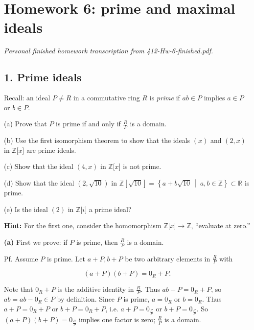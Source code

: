 \chapter{Homework 6: prime and maximal ideals}

\emph{Personal finished homework transcription from 412-Hw-6-finished.pdf.}

\section{1. Prime ideals}

Recall: an ideal \(P \neq R\) in a commutative ring \(R\) is \emph{prime} if \(ab \in P\) implies \(a \in P\) or \(b \in P\).

(a) Prove that \(P\) is prime if and only if \(\frac{R}{P}\) is a domain.

(b) Use the first isomorphism theorem to show that the ideals \((x)\) and \(\left( {2,x} \right)\) in \(\mathbb{Z}\lbrack x\rbrack\) are prime ideals.

(c) Show that the ideal \(\left( {4,x} \right)\) in \(\mathbb{Z}\lbrack x\rbrack\) is not prime.

(d) Show that the ideal \(\left( {2,\sqrt{10}} \right)\) in \(\mathbb{Z}\left\lbrack \sqrt{10} \right\rbrack = \left\{ a + b\sqrt{10}\  \middle| \ a,b \in \mathbb{Z} \right\} \subset \mathbb{R}\) is prime.

(e) Is the ideal \((2)\) in \(\mathbb{Z}\lbrack i\rbrack\) a prime ideal?

\textbf{Hint:} For the first one, consider the homomorphism \(\mathbb{Z}\lbrack x\rbrack\rightarrow\mathbb{Z}\), ``evaluate at zero.''

\textbf{(a)} First we prove: if \(P\) is prime, then \(\frac{R}{P}\) is a domain.

Pf. Assume \(P\) is prime. Let \(a + P,b + P\) be two arbitrary elements in \(\frac{R}{P}\) with

\[\left( {a + P} \right)\left( {b + P} \right) = 0_{R} + P.\]

Note that \(0_{R} + P\) is the additive identity in \(\frac{R}{P}\). Thus \(ab + P = 0_{R} + P\), so \(ab = ab - 0_{R} \in P\) by definition. Since \(P\) is prime, \(a = 0_{R}\) or \(b = 0_{R}\). Thus \(a + P = 0_{R} + P\) or \(b + P = 0_{R} + P\), i.e. \(a + P = 0_{\frac{R}{P}}\) or \(b + P = 0_{\frac{R}{P}}\). So \(\left( {a + P} \right)\left( {b + P} \right) = 0_{\frac{R}{P}}\) implies one factor is zero; \(\frac{R}{P}\) is a domain.

